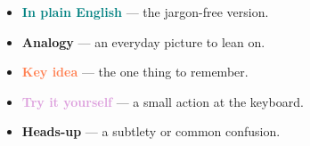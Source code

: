 \documentclass[11pt,oneside]{article}
\begin{document}
\begin{itemize}[leftmargin=1.4em,itemsep=2pt]
  \item \textcolor{teal}{\textbf{In plain English}} --- the jargon-free version.
  \item \textcolor{forest}{\textbf{Analogy}} --- an everyday picture to lean on.
  \item \textcolor{coral}{\textbf{Key idea}} --- the one thing to remember.
  \item \textcolor{plum}{\textbf{Try it yourself}} --- a small action at the keyboard.
  \item \textcolor{dim}{\textbf{Heads-up}} --- a subtlety or common confusion.
\end{itemize}
\clearpage











\end{document}
